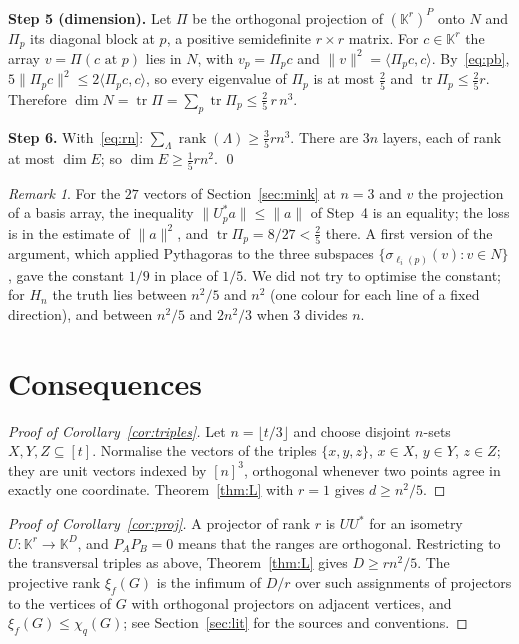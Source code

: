 \documentclass[11pt]{article}
\theoremstyle{remark}
\newtheorem{remark}[theorem]{Remark}
\newcommand{\K}{\mathbb{K}}
\newcommand{\ip}[2]{\langle #1,#2\rangle}
\newcommand{\norm}[1]{\lVert #1\rVert}
\newcommand{\rank}{\operatorname{rank}}
\newcommand{\tr}{\operatorname{tr}}
\newcommand{\floor}[1]{\lfloor #1\rfloor}
\newcommand{\Hn}{H_n}
\begin{document}
\noindent\textbf{Step 5 (dimension).} Let $\Pi$ be the orthogonal projection of $(\K^r)^P$ onto $N$ and
$\Pi_p$ its diagonal block at $p$, a positive semidefinite $r\times r$ matrix. For $c\in\K^r$ the array
$v=\Pi(c\text{ at }p)$ lies in $N$, with $v_p=\Pi_pc$ and $\norm v^2=\ip{\Pi_pc}{c}$. By~\eqref{eq:pb},
$5\norm{\Pi_pc}^2\le2\ip{\Pi_pc}{c}$, so every eigenvalue of $\Pi_p$ is at most $\tfrac25$ and
$\tr\Pi_p\le\tfrac25r$. Therefore $\dim N=\tr\Pi=\sum_p\tr\Pi_p\le\tfrac25\,r\,n^3$.

\smallskip\noindent\textbf{Step 6.} With~\eqref{eq:rn}: $\sum_\Lambda\rank(\Lambda)\ge\tfrac35rn^3$. There are
$3n$ layers, each of rank at most $\dim E$; so $\dim E\ge\tfrac15rn^2$. \qed

\begin{remark}
For the $27$ vectors of Section~\ref{sec:mink} at $n=3$ and $v$ the projection of a basis array, the
inequality $\norm{U_p^*a}\le\norm a$ of Step~4 is an equality; the loss is in the estimate of $\norm a^2$, and
$\tr\Pi_p=8/27<\tfrac25$ there. A first version of the argument, which applied Pythagoras to the three
subspaces $\{\sigma_{\ell_i(p)}(v):v\in N\}$, gave the constant $1/9$ in place of $1/5$. We did not try to
optimise the constant; for $\Hn$ the truth lies between $n^2/5$ and $n^2$ (one colour for each line of a fixed
direction), and between $n^2/5$ and $2n^2/3$ when $3$ divides $n$.
\end{remark}

\section{Consequences}

\begin{proof}[Proof of Corollary~\ref{cor:triples}]
Let $n=\floor{t/3}$ and choose disjoint $n$-sets $X,Y,Z\subseteq[t]$. Normalise the vectors of the triples
$\{x,y,z\}$, $x\in X$, $y\in Y$, $z\in Z$; they are unit vectors indexed by $[n]^3$, orthogonal whenever two
points agree in exactly one coordinate. Theorem~\ref{thm:L} with $r=1$ gives $d\ge n^2/5$.
\end{proof}

\begin{proof}[Proof of Corollary~\ref{cor:proj}]
A projector of rank $r$ is $U U^*$ for an isometry $U\colon\K^r\to\K^D$, and $P_AP_B=0$ means that the ranges
are orthogonal. Restricting to the transversal triples as above, Theorem~\ref{thm:L} gives $D\ge rn^2/5$.
The projective rank $\xi_f(G)$ is the infimum of $D/r$ over such assignments of projectors to the vertices of
$G$ with orthogonal projectors on adjacent vertices, and $\xi_f(G)\le\chi_q(G)$; see Section~\ref{sec:lit}
for the sources and conventions.
\end{proof}
\end{document}
